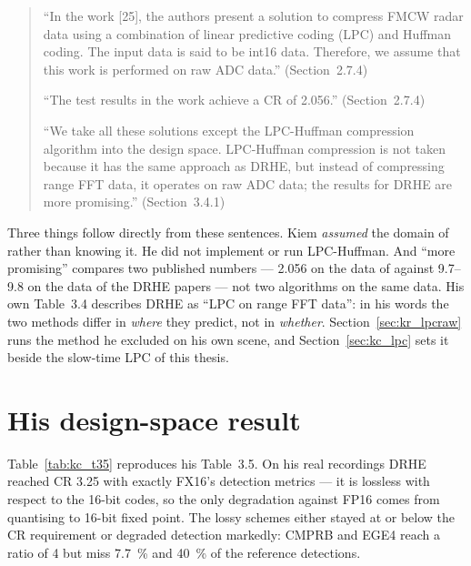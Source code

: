 \begin{quote}\small
``In the work [25], the authors present a solution to compress FMCW radar data
using a combination of linear predictive coding (LPC) and Huffman coding. The
input data is said to be int16 data. Therefore, we assume that this work is
performed on raw ADC data.'' (Section~2.7.4)

``The test results in the work achieve a CR of 2.056.'' (Section~2.7.4)

``We take all these solutions except the LPC-Huffman compression algorithm into
the design space. LPC-Huffman compression is not taken because it has the same
approach as DRHE, but instead of compressing range FFT data, it operates on raw
ADC data; the results for DRHE are more promising.'' (Section~3.4.1)
\end{quote}

\noindent
Three things follow directly from these sentences. Kiem \emph{assumed} the
domain of \cite{meucci2022} rather than knowing it. He did not implement or run
LPC-Huffman. And ``more promising'' compares two published numbers --- 2.056 on
the data of \cite{meucci2022} against 9.7--9.8 on the data of the DRHE papers
--- not two algorithms on the same data. His own Table~3.4 describes DRHE as
``LPC on range FFT data'': in his words the two methods differ in \emph{where}
they predict, not in \emph{whether}. Section~\ref{sec:kr_lpcraw} runs the
method he excluded on his own scene, and Section~\ref{sec:kc_lpc} sets it beside
the slow-time LPC of this thesis.

\section{His design-space result}
\label{sec:kc_dse}

Table~\ref{tab:kc_t35} reproduces his Table~3.5. On his real recordings DRHE
reached CR \num{3.25} with exactly FX16's detection metrics --- it is lossless
with respect to the 16-bit codes, so the only degradation against FP16 comes
from quantising to 16-bit fixed point. The lossy schemes either stayed at or
below the CR requirement or degraded detection markedly: CMPRB and EGE4 reach
a ratio of 4 but miss \SI{7.7}{\percent} and \SI{40}{\percent} of the
reference detections.

